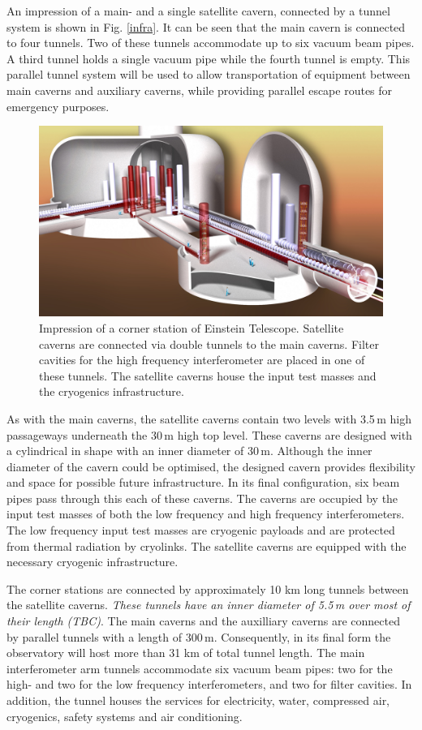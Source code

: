 An impression of a main- and a single satellite cavern, connected by a tunnel system is shown in Fig. \ref{infra}. It can be seen that the main cavern is connected to four tunnels. Two of these tunnels accommodate up to six vacuum beam pipes. A third tunnel holds a single vacuum pipe while the fourth tunnel is empty. This parallel tunnel system will be used to allow transportation of equipment between main caverns and auxiliary caverns, while providing parallel escape routes for emergency purposes.
\begin{figure}[h!]
    \centering
    \includegraphics[width=17cm]{SiteInfra/TunnelsCaverns/TunnelsCavernsFigures/ArtisticView1.jpg}
    \caption{Impression of a corner station of Einstein Telescope. Satellite caverns are connected via double tunnels to the main caverns.  Filter cavities for the high frequency interferometer are placed in one of these tunnels. The satellite caverns house the input test masses and the cryogenics infrastructure.}
    \label{fig:infra}
\end{figure}
As with the main caverns, the satellite caverns contain two levels with 3.5\,m high passageways underneath the 30\,m high top level. These caverns are designed with a cylindrical in shape with an inner diameter of 30\,m. Although the inner diameter of the cavern could be optimised, the designed cavern provides flexibility and space for possible future infrastructure. In its final configuration, six beam pipes pass through this each of these caverns. The caverns are occupied by the input test masses of both the low frequency and high frequency interferometers. The low frequency input test masses are cryogenic payloads and are protected from thermal radiation by cryolinks. The satellite caverns are equipped with the necessary cryogenic infrastructure. 

The corner stations are connected by approximately 10 km long tunnels between the satellite caverns. {\it These tunnels have an inner diameter of 5.5\,m over most of their length (TBC)}. The main caverns and the auxilliary caverns are connected by parallel tunnels with a length of 300\,m. Consequently, in its final form the observatory will host more than 31 km of total tunnel length. The main interferometer arm tunnels accommodate six vacuum beam pipes: two for the high- and two for the low frequency interferometers, and two for filter cavities. In addition, the tunnel houses the services for electricity, water, compressed air, cryogenics, safety systems and air conditioning. 

